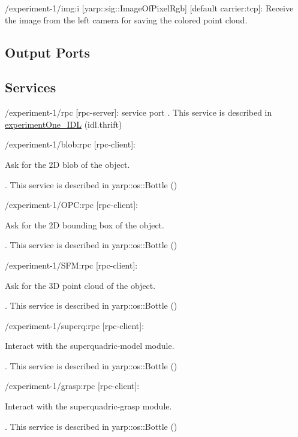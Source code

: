 \begin{DoxyItemize}
\item /experiment-\/1/img\-:i \mbox{[}yarp\-::sig\-::\-Image\-Of\-Pixel\-Rgb\mbox{]} \mbox{[}default carrier\-:tcp\mbox{]}\-: Receive the image from the left camera for saving the colored point cloud.
\end{DoxyItemize}\hypertarget{group__experiment-1_outputports_sec}{}\subsection{Output Ports}\label{group__experiment-1_outputports_sec}
\hypertarget{group__experiment-1_services_sec}{}\subsection{Services}\label{group__experiment-1_services_sec}

\begin{DoxyItemize}
\item /experiment-\/1/rpc \mbox{[}rpc-\/server\mbox{]}\-: service port . This service is described in \hyperlink{classexperimentOne__IDL}{experiment\-One\-\_\-\-I\-D\-L} (idl.\-thrift)
\item /experiment-\/1/blob\-:rpc \mbox{[}rpc-\/client\mbox{]}\-:

Ask for the 2\-D blob of the object.

. This service is described in yarp\-::os\-::\-Bottle ()
\item /experiment-\/1/\-O\-P\-C\-:rpc \mbox{[}rpc-\/client\mbox{]}\-:

Ask for the 2\-D bounding box of the object.

. This service is described in yarp\-::os\-::\-Bottle ()
\item /experiment-\/1/\-S\-F\-M\-:rpc \mbox{[}rpc-\/client\mbox{]}\-:

Ask for the 3\-D point cloud of the object.

. This service is described in yarp\-::os\-::\-Bottle ()
\item /experiment-\/1/superq\-:rpc \mbox{[}rpc-\/client\mbox{]}\-:

Interact with the superquadric-\/model module.

. This service is described in yarp\-::os\-::\-Bottle ()
\item /experiment-\/1/grasp\-:rpc \mbox{[}rpc-\/client\mbox{]}\-:

Interact with the superquadric-\/grasp module.

. This service is described in yarp\-::os\-::\-Bottle () 
\end{DoxyItemize}